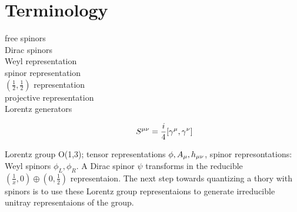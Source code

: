 \section{Terminology}
\begin{description}
    \item [free spinors]
    \item [Dirac spinors]
    \item [Weyl representation]
    \item [spinor representation]
    \item [$(\frac{1}{2}, \frac{1}{2})$ representation]
    \item [projective representation]
    \item [Lorentz generators]
	\[
	    S^{\mu\nu} = \frac{i}{4}[\gamma^\mu, \gamma^\nu]
	\]
\end{description}


Lorentz group O(1,3); tensor representations $\phi,A_\mu, h_{\mu\nu}$, spinor
represontations: Weyl spinors $\phi_L, \phi_R$. A Dirac spinor $\psi$
transforms in the reducible $(\frac{1}{x},0)\oplus(0, \frac{1}{2})$
representaion.
The next step towards quantizing a thory with spinors is to use these
Lorentz group representaions to generate irreducible unitray representaions
of the \Poincare{} group.


